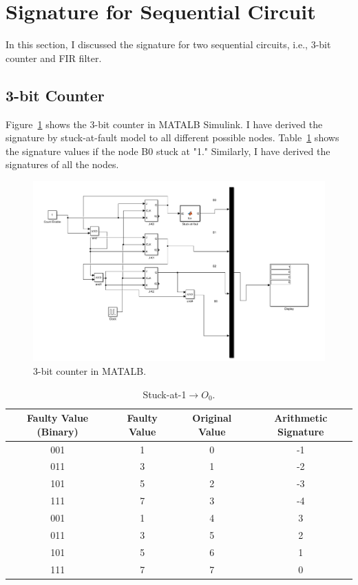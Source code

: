 \section{Signature for Sequential Circuit}
In this section, I discussed the signature for two sequential circuits, i.e., 3-bit counter and FIR filter.
\subsection{3-bit Counter}

Figure~\ref{fig:matlab} shows the 3-bit counter in MATALB Simulink. I have derived the signature by stuck-at-fault model to all different possible nodes. Table~\ref{s@1-O0}  shows the signature values if the node B0 stuck at "1." Similarly, I have derived the signatures of all the nodes.

\begin{figure}[tb!]
 \centering
  \captionsetup{justification=centering}    
   \includegraphics[scale=0.4]{Figures/matlab-counter.pdf}
   \caption{3-bit counter in MATALB.}
\label{fig:matlab}
\end{figure}

\begin{table}[tb!]
\center
\caption{Stuck-at-1$\rightarrow O_0$.}
\label{s@1-O0}
\begin{tabular}{|c | c| c | c| } 
 \hline
 \rowcolor{lightgray}
Faulty Value (Binary) & Faulty Value & Original Value & Arithmetic Signature   \\ 
\hline
 
 
 001& 1 &0 & -1  \\
 \hline
 011 & 3 & 1 & -2 \\ 
 \hline
 
 101 & 5 & 2 & -3 \\
 \hline
 111& 7& 3& -4 \\
 \hline
 001 & 1  &  4& 3 \\
 \hline
 011 & 3 & 5 &2  \\
 \hline
 101 & 5 & 6 & 1 \\
 \hline
 111 & 7 & 7 & 0 \\
 \hline
 
 
\end{tabular}
\end{table}


